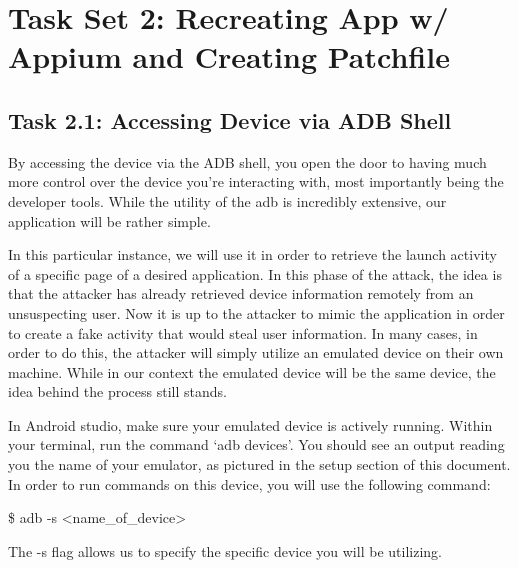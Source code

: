 \documentclass[letterpaper,12pt]{report}
\begin{document}

\section*{Task Set 2: Recreating App w/ Appium and Creating Patchfile}\label{sec:Task Set 2: Recreating App w/ Appium and Creating Patchfile}

\subsection*{Task 2.1: Accessing Device via ADB Shell}\label{Task-2.1-Accessing-Device-via-ADB-Shell}

By accessing the device via the ADB shell, you open the door to having much more control over the device you’re interacting with, most importantly being the developer tools. While the utility of the adb is incredibly extensive, our application will be rather simple.

In this particular instance, we will use it in order to retrieve the launch activity of a specific page of a desired application. In this phase of the attack, the idea is that the attacker has already retrieved device information remotely from an unsuspecting user. Now it is up to the attacker to mimic the application in order to create a fake activity that would steal user information. In many cases, in order to do this, the attacker will simply utilize an emulated device on their own machine. While in our context the emulated device will be the same device, the idea behind the process still stands.

In Android studio, make sure your emulated device is actively running. Within your terminal, run the command ‘adb devices’. You should see an output reading you the name of your emulator, as pictured in the setup section of this document. In order to run commands on this device, you will use the following command:

\bigskip
\begin{mdframed}[backgroundcolor=black!12,style=code,nobreak=true,align=center,userdefinedwidth=14cm]
    \$ adb -s <name\_of\_device>
\end{mdframed}
The -s flag allows us to specify the specific device you will be utilizing.
\end{document}
